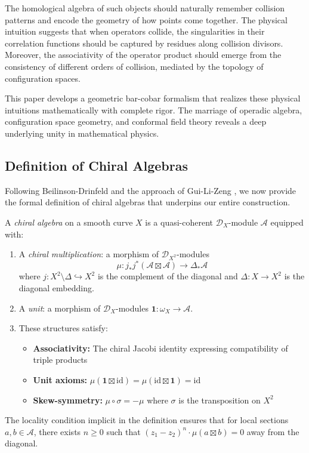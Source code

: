 The homological algebra of such objects should naturally remember collision patterns and encode the geometry of how points come together. The physical intuition suggests that when operators collide, the singularities in their correlation functions should be captured by residues along collision divisors. Moreover, the associativity of the operator product should emerge from the consistency of different orders of collision, mediated by the topology of configuration spaces. 
 
This paper develops a geometric bar-cobar formalism that realizes these physical intuitions mathematically with complete rigor. The marriage of operadic algebra, configuration space geometry, and conformal field theory reveals a deep underlying unity in mathematical physics.

\subsection{Definition of Chiral Algebras}

Following Beilinson-Drinfeld \cite{BD} and the approach of Gui-Li-Zeng \cite{GLZ}, we now provide the formal definition of chiral algebras that underpins our entire construction.

\begin{definition}\label{def:chiral-algebra}
A \emph{chiral algebra} on a smooth curve $X$ is a quasi-coherent $\mathcal{D}_X$-module $\mathcal{A}$ equipped with:
\begin{enumerate}
\item A \emph{chiral multiplication}: a morphism of $\mathcal{D}_{X^2}$-modules
\[
\mu: j_*j^*(\mathcal{A} \boxtimes \mathcal{A}) \to \Delta_*\mathcal{A}
\]
where $j: X^2 \setminus \Delta \hookrightarrow X^2$ is the complement of the diagonal and $\Delta: X \to X^2$ is the diagonal embedding.

\item A \emph{unit}: a morphism of $\mathcal{D}_X$-modules $\mathbf{1}: \omega_X \to \mathcal{A}$.

\item These structures satisfy:
\begin{itemize}
\item \textbf{Associativity:} The chiral Jacobi identity expressing compatibility of triple products
\item \textbf{Unit axioms:} $\mu(\mathbf{1} \boxtimes \text{id}) = \mu(\text{id} \boxtimes \mathbf{1}) = \text{id}$
\item \textbf{Skew-symmetry:} $\mu \circ \sigma = -\mu$ where $\sigma$ is the transposition on $X^2$
\end{itemize}
\end{enumerate}
The locality condition implicit in the definition ensures that for local sections $a, b \in \mathcal{A}$, there exists $n \geq 0$ such that $(z_1 - z_2)^n \cdot \mu(a \boxtimes b) = 0$ away from the diagonal.
\end{definition}

